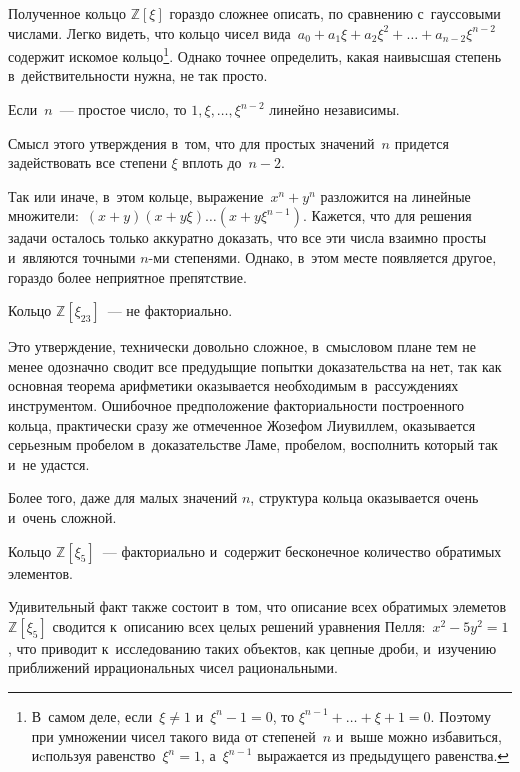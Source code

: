 \documentclass{article}
\begin{document}
Полученное кольцо $\mathbb{Z}[\xi]$ гораздо сложнее описать, по сравнению
с~гауссовыми числами. Легко видеть, что кольцо чисел
вида~$a_0 + a_1 \xi + a_2 \xi^2 + \ldots + a_{n-2} \xi^{n-2}$ содержит искомое
кольцо\footnote{
  В~самом деле, если~$\xi \ne 1$ и~$\xi^n - 1 = 0$, то
  $\xi^{n - 1} + \ldots + \xi + 1 = 0$. Поэтому при умножении чисел такого вида
  от степеней~$n$ и~выше можно избавиться, иcпользуя равенство~$\xi^n = 1$,
  а~$\xi^{n-1}$ выражается из предыдущего равенства.}.
Однако точнее определить, какая наивысшая степень в~действительности нужна, не
так просто.

\begin{exercise}[сложное]
  Если~$n$~--- простое число, то $1, \xi, \ldots, \xi^{n-2}$ линейно независимы.
\end{exercise}
\begin{remark}
  Смысл этого утверждения в~том, что для простых значений~$n$ придется
  задействовать все степени $\xi$ вплоть до~$n - 2$.
\end{remark}

Так или иначе, в~этом кольце, выражение~$x^n + y^n$ разложится на линейные
множители:~$(x+y)(x+y\xi)\ldots(x+y\xi^{n-1})$. Кажется, что для решения задачи
осталось только аккуратно доказать, что все эти числа взаимно просты и~являются
точными $n$-ми степенями. Однако, в~этом месте появляется другое, гораздо более
неприятное препятствие.

\begin{claim}
  Кольцо $\mathbb{Z}[\xi_{23}]$~--- не факториально.
\end{claim}

Это утверждение, технически довольно сложное, в~смысловом плане тем не менее
одозначно сводит все предудыщие попытки доказательства на нет, так как основная
теорема арифметики оказывается необходимым в~рассуждениях инструментом.
Ошибочное предположение факториальности построенного кольца, практически сразу
же отмеченное Жозефом Лиувиллем, оказывается серьезным пробелом в~доказательстве
Ламе, пробелом, восполнить который так и~не удастся.

Более того, даже для малых значений $n$, структура кольца оказывается очень
и~очень сложной.

\begin{claim}
  Кольцо $\mathbb{Z}[\xi_5]$~--- факториально и~содержит бесконечное количество
  обратимых элементов.
\end{claim}
\begin{remark}
  Удивительный факт также состоит в~том, что описание всех обратимых элеметов
  $\mathbb{Z}[\xi_5]$ сводится к~описанию всех целых решений уравнения
  Пелля:~$x^2 - 5y^2 = 1$, что приводит к~исследованию таких объектов, как
  цепные дроби, и~изучению приближений иррациональных чисел рациональными.
\end{remark}
\end{document}
